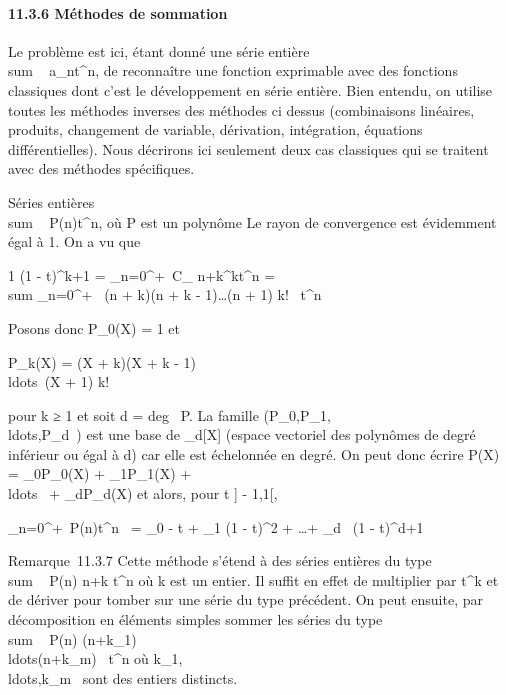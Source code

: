 \documentclass[]{article}
\begin{document}
\paragraph{11.3.6 Méthodes de sommation}

Le problème est ici, étant donné une série entière
\\sum ~
a_nt^n, de reconnaître une fonction exprimable avec
des fonctions classiques dont c'est le développement en série entière.
Bien entendu, on utilise toutes les méthodes inverses des méthodes ci
dessus (combinaisons linéaires, produits, changement de variable,
dérivation, intégration, équations différentielles). Nous décrirons ici
seulement deux cas classiques qui se traitent avec des méthodes
spécifiques.

Séries entières \\sum ~
P(n)t^n, où P est un polynôme Le rayon de convergence est
évidemment égal à 1. On a vu que

 1 \over (1 - t)^k+1 =
\sum _n=0^+\infty~C_
n+k^kt^n = \\sum
_n=0^+\infty~ (n + k)(n + k -
1)\ldots(n + 1) \over k!~
t^n

Posons donc P_0(X) = 1 et

P_k(X) = (X + k)(X + k -
1)\\ldots~(X + 1)
\over k!

pour k ≥ 1 et soit d = deg~ P. La famille
(P_0,P_1,\\ldots,P_d~)
est une base de _d[X] (espace vectoriel des polynômes de
degré inférieur ou égal à d) car elle est échelonnée en degré. On peut
donc écrire P(X) = \lambda_0P_0(X) +
\lambda_1P_1(X) +
\\ldots~ +
\lambda_dP_d(X) et alors, pour t \in] - 1,1[,

\sum _n=0^+\infty~P(n)t^n~
= \lambda_0  - t + \lambda_1
\over (1 - t)^2 +
\ldots + \lambda_d~ \over
(1 - t)^d+1

Remarque~11.3.7 Cette méthode s'étend à des séries entières du type
\\sum ~  P(n)
\over n+k t^n où k est un entier. Il suffit
en effet de multiplier par t^k et de dériver pour tomber sur
une série du type précédent. On peut ensuite, par décomposition en
éléments simples sommer les séries du type
\\sum ~  P(n)
\over
(n+k_1)\\ldots(n+k_m)~
t^n où
k_1,\\ldots,k_m~
sont des entiers distincts.
\end{document}

